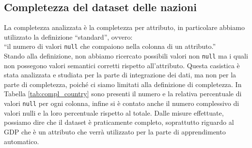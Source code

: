 \subsection{Completezza del dataset delle nazioni}
\label{subsec:compl_country}
La completezza analizzata è la completezza per attributo, in particolare abbiamo utilizzato la definizione “standard”, ovvero:\\“il numero di valori  \texttt{null} che compaiono nella colonna di un attributo.”\\
Stando alla definizione, non abbiamo ricercato possibili valori non \texttt{null} ma i quali non possegono valori semantici corretti rispetto all'attributo.
Questa casistica è stata analizzata e studiata per la parte di integrazione dei dati, ma non per la parte di completezza, poiché ci siamo limitati alla definizione di completezza. 
In Tabella \ref{tab:compl_country} sono presenti il numero e la relativa percentuale di valori \texttt{null} per ogni colonna, infine si è contato anche il numero complessivo di valori nulli e la loro percentuale rispetto al totale.
Dalle misure effettuate, possiamo dire che il dataset è praticamente completo, soprattutto riguardo al GDP che è un attributo che verrà utilizzato per la parte di apprendimento automatico.
